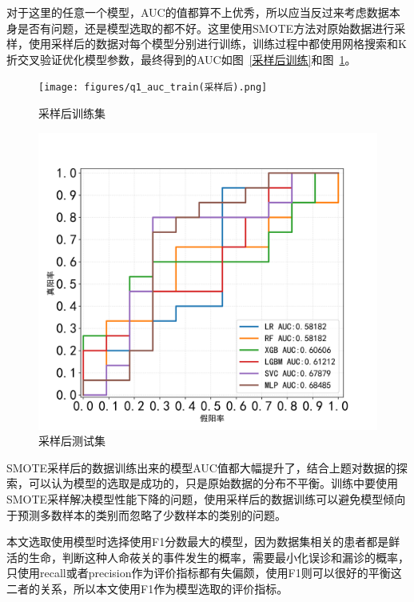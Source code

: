 \documentclass[bwprint]{gmcmthesis}
\begin{document}
对于这里的任意一个模型，AUC的值都算不上优秀，所以应当反过来考虑数据本身是否有问题，还是模型选取的都不好。这里使用SMOTE方法对原始数据进行采样，使用采样后的数据对每个模型分别进行训练，训练过程中都使用网格搜索和K折交叉验证优化模型参数，最终得到的AUC如图~\ref{采样后训练}和图~\ref{采样后测试}。

\begin{figure}
\centering
  \begin{minipage}{0.45\linewidth}
    \centering
    \texttt{[image: figures/q1\_auc\_train(采样后).png]}
    \caption{采样后训练集}
    \label{采样后训练}
  \end{minipage}%
  \begin{minipage}{0.45\linewidth}
    \centering
    \includegraphics[width=\linewidth]{figures/q1_auc_test(采样后).png}
    \caption{采样后测试集}
    \label{采样后测试}
  \end{minipage}
\end{figure}

SMOTE采样后的数据训练出来的模型AUC值都大幅提升了，结合上题对数据的探索，可以认为模型的选取是成功的，只是原始数据的分布不平衡。训练中要使用SMOTE采样解决模型性能下降的问题，使用采样后的数据训练可以避免模型倾向于预测多数样本的类别而忽略了少数样本的类别的问题。

本文选取使用模型时选择使用F1分数最大的模型，因为数据集相关的患者都是鲜活的生命，判断这种人命莜关的事件发生的概率，需要最小化误诊和漏诊的概率，只使用recall或者precision作为评价指标都有失偏颇，使用F1则可以很好的平衡这二者的关系，所以本文使用F1作为模型选取的评价指标。
\end{document}
